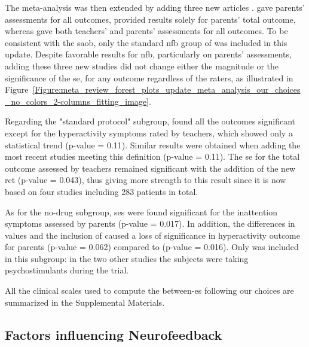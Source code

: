 The meta-analysis was then extended by adding three new articles \citep{Strehl2017, Baumeister2016, Bazanova2018}. 
\citet{Bazanova2018} gave parents' assessments for all outcomes, \citet{Baumeister2016} provided results solely for parents' 
total outcome, whereas \citet{Strehl2017} gave both teachers' and parents' assessments for all outcomes. To be consistent 
with the \gls{saob}, only the standard \gls{nfb} group of \citet{Bazanova2018} was included in this update. Despite favorable results 
for \gls{nfb}, particularly on parents' assessments, adding these three new studies did not change either the magnitude or the significance 
of the \gls{se}, for any outcome regardless of the raters, as illustrated in 
Figure~\ref{Figure:meta_review_forest_plots_update_meta_analysis_our_choices_no_colors_2-columns_fitting_image}. 

Regarding the "standard protocol" subgroup, \citet{Cortese2016} found all the outcomes significant except for the 
hyperactivity symptoms rated by teachers, which showed only a statistical trend (p-value = 0.11). Similar results 
were obtained when adding the most recent studies meeting this definition \citep{Strehl2017, Baumeister2016} (p-value = 0.11). 
The \gls{se} for the total outcome assessed by teachers remained significant with the addition of the new
\gls{rct} (p-value = 0.043), thus giving more strength to this result since it is now based on four studies including 283
patients in total.

As for the no-drug subgroup, \glspl{se} were found significant for the inattention symptoms assessed by parents (p-value = 0.017). 
In addition, the differences in \citet{Arnold2014} values and the inclusion of \citet{Bazanova2018} caused a 
loss of significance in hyperactivity outcome for parents (p-value = 0.062) compared to \citet{Cortese2016} 
(p-value = 0.016). Only \citet{Bazanova2018} was included in this subgroup: in the two other 
studies the subjects were taking psychostimulants during the trial.

All the clinical scales used to compute the between-\gls{es} following our choices are summarized in the Supplemental Materials.

\subsection{Factors influencing Neurofeedback}

